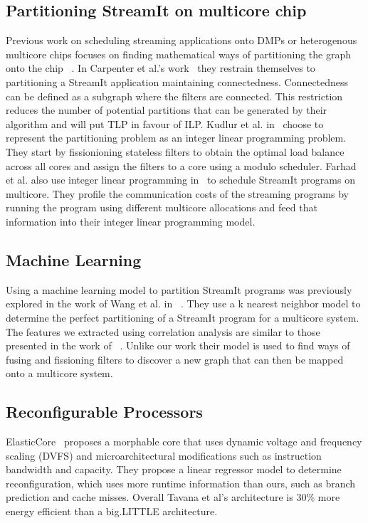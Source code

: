 \subsection{Partitioning StreamIt on multicore chip}

Previous work on scheduling streaming applications onto DMPs or heterogenous multicore chips focuses on finding mathematical ways of partitioning the graph onto the chip ~\cite{carpenter2009streammap,kudlur2008orchestratingstreamprog}.  
In Carpenter et al.'s work~\cite{carpenter2009streammap} they restrain themselves to partitioning a StreamIt application maintaining connectedness.
Connectedness can be defined as a subgraph where the filters are connected. 
This restriction reduces the number of potential partitions that can be generated by their algorithm and will put TLP in favour of ILP. 
Kudlur et al. in~\cite{kudlur2008orchestratingstreamprog} choose to represent the partitioning problem as an integer linear programming problem.
They start by fissionioning stateless filters to obtain the optimal load balance across all cores and assign the filters to a core using a modulo scheduler.
Farhad et al. also use integer linear programming in~\cite{farhad2012streamilp} to schedule StreamIt programs on multicore.
They profile the communication costs of the streaming programs by running the program using different multicore allocations and feed that information into their integer linear programming model.

\subsection{Machine Learning} Using a machine learning model to partition StreamIt programs was previously explored in the work of Wang et al. in ~\cite{wang2013partitionstreamit}.
They use a k nearest neighbor model to determine the perfect partitioning of a StreamIt program for a multicore system. 
The features we extracted using correlation analysis are similar to those presented in the work of ~\cite{wang2013partitionstreamit}.
Unlike our work their model is used to find ways of fusing and fissioning filters to discover a new graph that can then be mapped onto a multicore system.


\subsection{Reconfigurable Processors}

ElasticCore~\cite{tavanaElastic} proposes a morphable core that uses dynamic voltage and frequency scaling (DVFS) and microarchitectural modifications such as instruction bandwidth and capacity.
They propose a linear regressor model to determine reconfiguration, which uses more runtime information than ours, such as branch prediction and cache misses.
Overall Tavana et al's architecture is 30\% more energy efficient than a big.LITTLE architecture.

